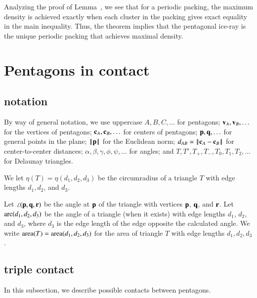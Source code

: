 \begin{remark}
Analyzing the proof of Lemma~, we see that for a
periodic packing, the maximum density is achieved exactly when each
 cluster in the packing gives exact equality in the main inequality.
Thus, the theorem implies that the pentagonal ice-ray  is the
unique periodic packing that achieves maximal density.
\end{remark}



\section{Pentagons in contact}


\subsection{notation}

By way of general notation, we use uppercase $A,B,C,\ldots$ for
pentagons; ${\mathbf v}_A,{\mathbf v}_B,\ldots$ for the vertices of pentagons;
${\mathbf c}_A,{\mathbf c}_B,\ldots$ for centers of pentagons; ${\mathbf p},{\mathbf q},\ldots$ for
general points in the plane; ${\hbox{\ensuremath{\hspace{0.1em}|\hspace{-0.1em}|\hspace{0.1em}}}{\mathbf p}\hbox{\ensuremath{\hspace{0.1em}|\hspace{-0.1em}|\hspace{0.1em}}}}$ for the Euclidean norm;
$\dx{AB}=\dd{A}{B}$ for center-to-center distances;
$\alpha,\beta,\gamma,\phi,\psi,\ldots$ for angles; and
$T,T',T_+,T_-,T_0,T_1,T_2,\ldots$ for Delaunay triangles.

We let $\eta(T) = \eta(d_1,d_2,d_3)$ be the circumradius of a triangle
$T$ with edge lengths $d_1,d_2$, and $d_3$.

Let $\angle({\mathbf p},{\mathbf q},{\mathbf r})$ be the angle at ${\mathbf p}$ of the triangle with
vertices ${\mathbf p}$, ${\mathbf q}$, and ${\mathbf r}$.  Let $\operatorname{arc}(d_1,d_2,d_3)$ be the angle
of a triangle (when it exists) with edge lengths $d_1$, $d_2$, and
$d_3$, where $d_3$ is the edge length of the edge opposite the
calculated angle.  We write ${\operatorname{area}}(T)= {\operatorname{area}}(d_1,d_2,d_3)$ for the
area of triangle $T$ with edge lengths $d_1,d_2,d_3$.


\subsection{triple contact}

In this subsection, we describe possible contacts between pentagons.

